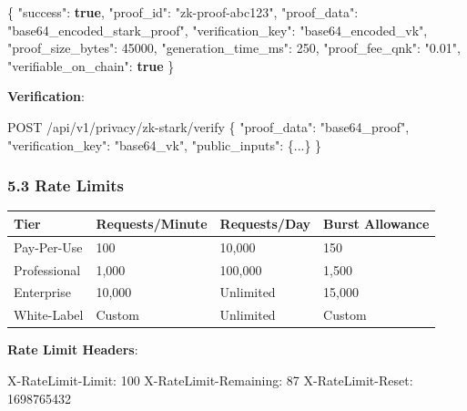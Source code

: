 \documentclass[
  11pt,
]{article}
\newenvironment{Shaded}{\begin{snugshade}}{\end{snugshade}}
\newcommand{\DataTypeTok}[1]{\textcolor[rgb]{0.13,0.29,0.53}{#1}}
\newcommand{\DecValTok}[1]{\textcolor[rgb]{0.00,0.00,0.81}{#1}}
\newcommand{\FunctionTok}[1]{\textcolor[rgb]{0.00,0.00,0.00}{#1}}
\newcommand{\KeywordTok}[1]{\textcolor[rgb]{0.13,0.29,0.53}{\textbf{#1}}}
\newcommand{\NormalTok}[1]{#1}
\newcommand{\StringTok}[1]{\textcolor[rgb]{0.31,0.60,0.02}{#1}}
\begin{document}
\begin{Shaded}
\begin{Highlighting}[]
\FunctionTok{\{}
  \DataTypeTok{"success"}\FunctionTok{:} \KeywordTok{true}\FunctionTok{,}
  \DataTypeTok{"proof\_id"}\FunctionTok{:} \StringTok{"zk{-}proof{-}abc123"}\FunctionTok{,}
  \DataTypeTok{"proof\_data"}\FunctionTok{:} \StringTok{"base64\_encoded\_stark\_proof"}\FunctionTok{,}
  \DataTypeTok{"verification\_key"}\FunctionTok{:} \StringTok{"base64\_encoded\_vk"}\FunctionTok{,}
  \DataTypeTok{"proof\_size\_bytes"}\FunctionTok{:} \DecValTok{45000}\FunctionTok{,}
  \DataTypeTok{"generation\_time\_ms"}\FunctionTok{:} \DecValTok{250}\FunctionTok{,}
  \DataTypeTok{"proof\_fee\_qnk"}\FunctionTok{:} \StringTok{"0.01"}\FunctionTok{,}
  \DataTypeTok{"verifiable\_on\_chain"}\FunctionTok{:} \KeywordTok{true}
\FunctionTok{\}}
\end{Highlighting}
\end{Shaded}

\textbf{Verification}:

\begin{Shaded}
\begin{Highlighting}[]
\NormalTok{POST /api/v1/privacy/zk{-}stark/verify}
\NormalTok{\{}
\NormalTok{  "proof\_data": "base64\_proof",}
\NormalTok{  "verification\_key": "base64\_vk",}
\NormalTok{  "public\_inputs": \{...\}}
\NormalTok{\}}
\end{Highlighting}
\end{Shaded}

\hypertarget{rate-limits}{%
\subsubsection{5.3 Rate Limits}\label{rate-limits}}

\begin{longtable}[]{@{}llll@{}}
\toprule
Tier & Requests/Minute & Requests/Day & Burst Allowance \\
\midrule
\endhead
Pay-Per-Use & 100 & 10,000 & 150 \\
Professional & 1,000 & 100,000 & 1,500 \\
Enterprise & 10,000 & Unlimited & 15,000 \\
White-Label & Custom & Unlimited & Custom \\
\bottomrule
\end{longtable}

\textbf{Rate Limit Headers}:

\begin{Shaded}
\begin{Highlighting}[]
\NormalTok{X{-}RateLimit{-}Limit: 100}
\NormalTok{X{-}RateLimit{-}Remaining: 87}
\NormalTok{X{-}RateLimit{-}Reset: 1698765432}
\end{Highlighting}
\end{Shaded}
\end{document}

